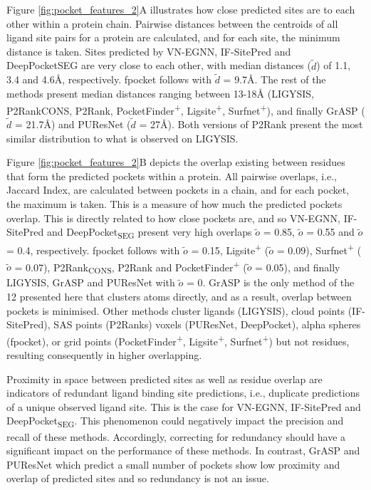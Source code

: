 Figure \ref{fig:pocket_features_2}A illustrates how close predicted sites are to each other within a protein chain. Pairwise distances between the centroids of all ligand site pairs for a protein are calculated, and for each site, the minimum distance is taken. Sites predicted by VN-EGNN, IF-SitePred and DeepPocketSEG are very close to each other, with median distances ($\tilde{d}$) of 1.1, 3.4 and 4.6\AA{}, respectively. fpocket follows with $\tilde{d}$ = 9.7\AA{}. The rest of the methods present median distances ranging between 13-18\AA{} (LIGYSIS, P2RankCONS, P2Rank, PocketFinder\textsuperscript{+}, Ligsite\textsuperscript{+}, Surfnet\textsuperscript{+}), and finally GrASP ($\tilde{d}$ = 21.7\AA{}) and PUResNet ($\tilde{d}$ = 27\AA{}). Both versions of P2Rank present the most similar distribution to what is observed on LIGYSIS.

Figure \ref{fig:pocket_features_2}B depicts the overlap existing between residues that form the predicted pockets within a protein. All pairwise overlaps, i.e., Jaccard Index, are calculated between pockets in a chain, and for each pocket, the maximum is taken. This is a measure of how much the predicted pockets overlap. This is directly related to how close pockets are, and so VN-EGNN, IF-SitePred and DeepPocket\textsubscript{SEG} present very high overlaps $\tilde{o}$ = 0.85, $\tilde{o}$ = 0.55 and $\tilde{o}$ = 0.4, respectively. fpocket follows with $\tilde{o}$ = 0.15, Ligsite\textsuperscript{+} ($\tilde{o}$ = 0.09), Surfnet\textsuperscript{+} ($\tilde{o}$ = 0.07), P2Rank\textsubscript{CONS}, P2Rank and PocketFinder\textsuperscript{+} ($\tilde{o}$ = 0.05), and finally LIGYSIS, GrASP and PUResNet with $\tilde{o}$ = 0. GrASP is the only method of the 12 presented here that clusters atoms directly, and as a result, overlap between pockets is minimised. Other methods cluster ligands (LIGYSIS), cloud points (IF-SitePred), SAS points (P2Ranks) voxels (PUResNet, DeepPocket), alpha spheres (fpocket), or grid points (PocketFinder\textsuperscript{+}, Ligsite\textsuperscript{+}, Surfnet\textsuperscript{+}) but not residues, resulting consequently in higher overlapping.

Proximity in space between predicted sites as well as residue overlap are indicators of redundant ligand binding site predictions, i.e., duplicate predictions of a unique observed ligand site. This is the case for VN-EGNN, IF-SitePred and DeepPocket\textsubscript{SEG}. This phenomenon could negatively impact the precision and recall of these methods. Accordingly, correcting for redundancy should have a significant impact on the performance of these methods. In contrast, GrASP and PUResNet which predict a small number of pockets show low proximity and overlap of predicted sites and so redundancy is not an issue.

